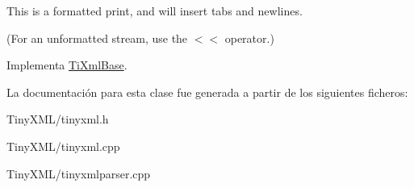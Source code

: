 This is a formatted print, and will insert tabs and newlines.

(For an unformatted stream, use the $<$$<$ operator.) 

Implementa \hyperlink{class_ti_xml_base_a0de56b3f2ef14c65091a3b916437b512}{Ti\-Xml\-Base}.



La documentación para esta clase fue generada a partir de los siguientes ficheros\-:\begin{DoxyCompactItemize}
\item 
Tiny\-X\-M\-L/tinyxml.\-h\item 
Tiny\-X\-M\-L/tinyxml.\-cpp\item 
Tiny\-X\-M\-L/tinyxmlparser.\-cpp\end{DoxyCompactItemize}
